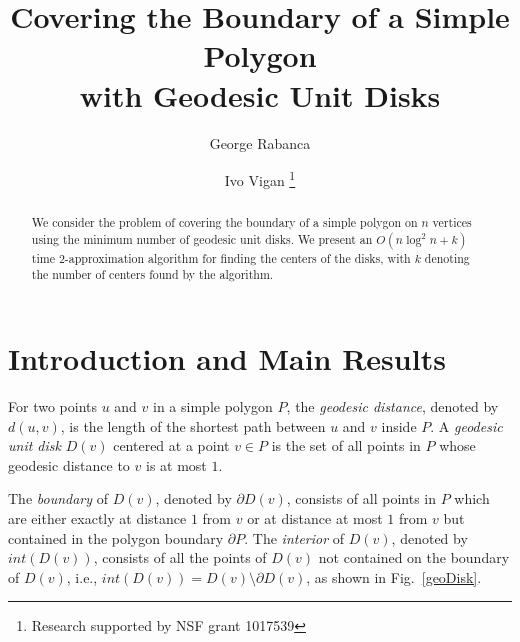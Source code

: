 \documentclass{llncs}
\title{Covering the Boundary of a Simple Polygon \\ with Geodesic Unit Disks}
\author{George Rabanca \and Ivo Vigan \thanks{Research supported by NSF grant 1017539}}
\institute{Department of Computer Science, City University of New York, \\The Graduate Center, New York, NY 10016, USA.}
\begin{document}
\maketitle



\begin{abstract}          
We consider the problem of covering the boundary of a simple polygon on $n$ vertices using the minimum number of geodesic unit disks. We present an $O(n \log^2 n+k)$ time $2$-approximation algorithm for finding the centers of the disks, with $k$ denoting the number of centers found by the algorithm.

\end{abstract}

\section{Introduction and Main Results}










For two points $u$ and $v$ in a simple polygon $P$, the \emph{geodesic distance}, denoted by $d(u,v)$, is the length of the shortest path between $u$ and $v$ inside $P$. A \emph{geodesic unit disk} $D(v)$ centered at a point $v \in P$ is the set of all points in $P$ whose geodesic distance to $v$ is at most $1$.

The \emph{boundary} of $D(v)$, denoted by $\partial D(v)$, consists of all points in $P$ which are either exactly at distance $1$ from $v$ or at distance at most $1$ from $v$ but contained in the polygon boundary $\partial P$. The \emph{interior} of $D(v)$, denoted by $int(D(v))$,  consists of all the points of $D(v)$ not contained on the boundary of $D(v)$, i.e.,  $int(D(v)) = D(v) \setminus \partial D(v)$,  as shown in Fig.~\ref{geoDisk}. 
\end{document}
